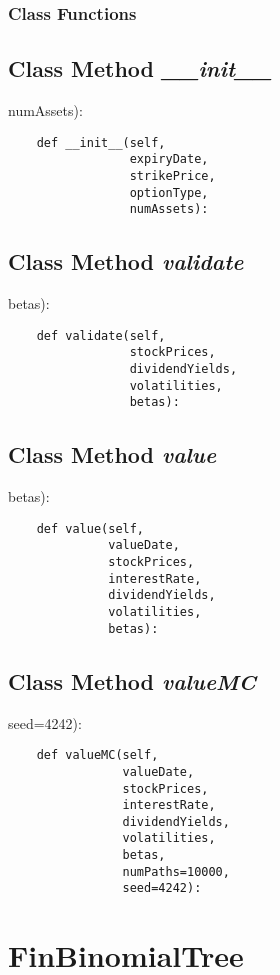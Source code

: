 \documentclass[twoside,11pt]{book}
\begin{document}
\subsubsection{Class Functions}

\subsection{Class Method {\it \_\_init\_\_}}
numAssets):

\begin{lstlisting}
    def __init__(self,
                 expiryDate,
                 strikePrice,
                 optionType,
                 numAssets):
\end{lstlisting}

\subsection{Class Method {\it validate}}
betas):

\begin{lstlisting}
    def validate(self,
                 stockPrices,
                 dividendYields,
                 volatilities,
                 betas):
\end{lstlisting}

\subsection{Class Method {\it value}}
betas):

\begin{lstlisting}
    def value(self,
              valueDate,
              stockPrices,
              interestRate,
              dividendYields,
              volatilities,
              betas):
\end{lstlisting}

\subsection{Class Method {\it valueMC}}
seed=4242):

\begin{lstlisting}
    def valueMC(self,
                valueDate,
                stockPrices,
                interestRate,
                dividendYields,
                volatilities,
                betas,
                numPaths=10000,
                seed=4242):
\end{lstlisting}

\newpage
\section{FinBinomialTree}
\end{document}
